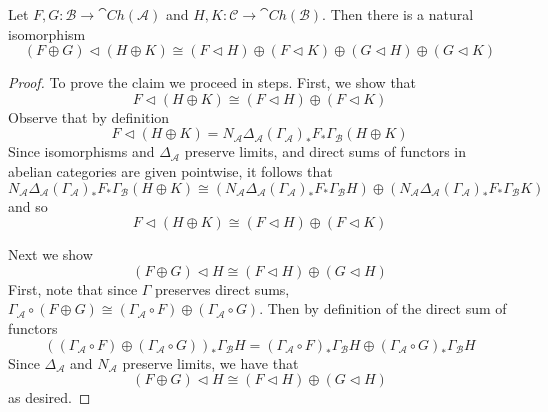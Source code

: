 \begin{lem}[label=lem:compDirSum]
    Let $F,G:\mathcal{B}\to \cat{Ch}(\mathcal{A})$ and $H,K:\mathcal{C}\to \cat{Ch}(\mathcal{B})$. Then there is a natural isomorphism
    \begin{equation*}
        (F\oplus G)\lhd (H\oplus K) \cong (F\lhd H)\oplus (F\lhd K)\oplus (G\lhd H)\oplus (G\lhd K)
    \end{equation*}
\end{lem}
\begin{proof}
    To prove the claim we proceed in steps. First, we show that
    \begin{equation*}
        F\lhd (H\oplus K) \cong (F\lhd H)\oplus (F\lhd K)
    \end{equation*}
    Observe that by definition 
    \begin{equation*}
        F\lhd (H\oplus K) = N_\mathcal{A}\Delta_\mathcal{A}(\Gamma_\mathcal{A})_*F_*\Gamma_\mathcal{B}(H\oplus K)
    \end{equation*}
    Since isomorphisms and $\Delta_\mathcal{A}$ preserve limits, and direct sums of functors in abelian categories are given pointwise, it follows that
    \begin{equation*}
        N_\mathcal{A}\Delta_\mathcal{A}(\Gamma_\mathcal{A})_*F_*\Gamma_\mathcal{B}(H\oplus K) \cong (N_\mathcal{A}\Delta_\mathcal{A}(\Gamma_\mathcal{A})_*F_*\Gamma_\mathcal{B}H)\oplus (N_\mathcal{A}\Delta_\mathcal{A}(\Gamma_\mathcal{A})_*F_*\Gamma_\mathcal{B}K)
    \end{equation*}
    and so 
    \begin{equation*}
        F\lhd (H\oplus K) \cong (F\lhd H)\oplus (F\lhd K)
    \end{equation*}

    \vspace{10pt}

    Next we show 
    \begin{equation*}
        (F\oplus G)\lhd H \cong (F\lhd H)\oplus (G\lhd H)
    \end{equation*}
    First, note that since $\Gamma$ preserves direct sums, $\Gamma_\mathcal{A}\circ (F\oplus G)\cong (\Gamma_\mathcal{A}\circ F)\oplus (\Gamma_\mathcal{A}\circ G)$. Then by definition of the direct sum of functors
    \begin{equation*}
        ((\Gamma_\mathcal{A}\circ F)\oplus (\Gamma_\mathcal{A}\circ G))_*\Gamma_\mathcal{B}H = (\Gamma_\mathcal{A}\circ F)_*\Gamma_\mathcal{B}H\oplus (\Gamma_\mathcal{A}\circ G)_*\Gamma_\mathcal{B}H
    \end{equation*}
    Since $\Delta_\mathcal{A}$ and $N_\mathcal{A}$ preserve limits, we have that 
    \begin{equation*}
        (F\oplus G)\lhd H \cong (F\lhd H)\oplus (G\lhd H)
    \end{equation*}
    as desired.
\end{proof}



